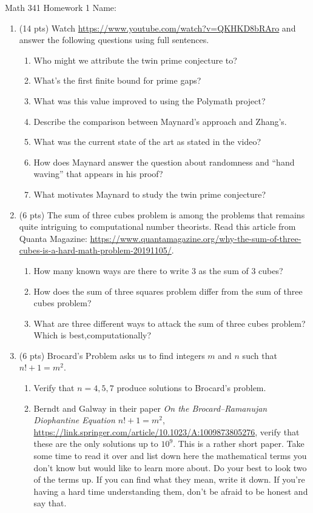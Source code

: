 \documentclass[12pt]{article}
\begin{document}
	Math 341 Homework 1
	\hfill
	Name: \underline{\hspace*{2in}}
	\begin{enumerate}
	\item (14 pts) Watch \url{https://www.youtube.com/watch?v=QKHKD8bRAro} and answer the following questions using full sentences.	
		\begin{enumerate}
			\item Who might we attribute the twin prime conjecture to?
				\vfill
			\item What's the first finite bound for prime gaps?
				\vfill
			\item What was this value improved to using the Polymath project?
				\vfill
			\item Describe the comparison between Maynard's approach and Zhang's.
				\vfill
			\item What was the current state of the art as stated in the video?
				\vfill
			\item How does Maynard answer the question about randomness and ``hand waving'' that appears in his proof?
				\vfill
			\item What motivates Maynard to study the twin prime conjecture?
				\vfill
		\end{enumerate}
	\newpage
	\item (6 pts) The sum of three cubes problem is among the problems that remains quite intriguing to computational number theorists. Read this article from Quanta Magazine: {\footnotesize\url{https://www.quantamagazine.org/why-the-sum-of-three-cubes-is-a-hard-math-problem-20191105/}}.  
		\begin{enumerate}
			\item How many known ways are there to write 3 as the sum of 3 cubes?
			\vfill
			\item How does the sum of three squares problem differ from the sum of three cubes problem?
			\vfill
			\item What are three different ways to attack the sum of three cubes problem? Which is best,computationally?
			\vfill
		\end{enumerate}
	\newpage
	\item (6 pts) Brocard's Problem asks us to find integers $m$ and $n$ such that $n!+1=m^2$.
		\begin{enumerate}
			\item Verify that $n=4,5,7$ produce solutions to Brocard's problem.
				\vskip 2in
			\item Berndt and Galway in their paper \textit{On the Brocard--Ramanujan Diophantine Equation $n!+1=m^2$}, \url{https://link.springer.com/article/10.1023/A:1009873805276}, verify that these are the only solutions up to $10^9$.  This is a rather short paper. Take some time to read it over and list down here the mathematical terms you don't know but would like to learn more about.  Do your best to look two of the terms up.  If you can find what they mean, write it down.  If you're having a hard time understanding them, don't be afraid to be honest and say that.

\end{enumerate}
\end{enumerate}
\end{document}
